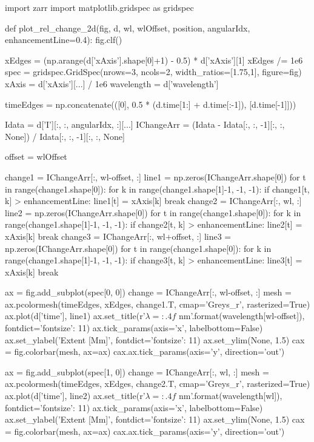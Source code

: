 \begin{pycode}[2DRT]
import zarr
import matplotlib.gridspec as gridspec


def plot_rel_change_2d(fig, d, wl, wlOffset, position, angularIdx, enhancementLine=0.4):
    fig.clf()

    xEdges = (np.arange(d['xAxis'].shape[0]+1) - 0.5) * d['xAxis'][1]
    xEdges /= 1e6
    spec = gridspec.GridSpec(nrows=3, ncols=2, width_ratios=[1.75,1], figure=fig)
    xAxis = d['xAxis'][...] / 1e6
    wavelength = d['wavelength']

    timeEdges = np.concatenate(([0],
                                0.5 * (d.time[1:] + d.time[:-1]),
                                [d.time[-1]]))

    Idata = d['I'][:, :, angularIdx, :][...]
    IChangeArr = (Idata - Idata[:, :, -1][:, :, None]) / Idata[:, :, -1][:, :, None]

    offset = wlOffset

    change1 = IChangeArr[:, wl-offset, :]
    line1 = np.zeros(IChangeArr.shape[0])
    for t in range(change1.shape[0]):
        for k in range(change1.shape[1]-1, -1, -1):
            if change1[t, k] > enhancementLine:
                line1[t] = xAxis[k]
                break
    change2 = IChangeArr[:, wl, :]
    line2 = np.zeros(IChangeArr.shape[0])
    for t in range(change1.shape[0]):
        for k in range(change1.shape[1]-1, -1, -1):
            if change2[t, k] > enhancementLine:
                line2[t] = xAxis[k]
                break
    change3 = IChangeArr[:, wl+offset, :]
    line3 = np.zeros(IChangeArr.shape[0])
    for t in range(change1.shape[0]):
        for k in range(change1.shape[1]-1, -1, -1):
            if change3[t, k] > enhancementLine:
                line3[t] = xAxis[k]
                break

    ax = fig.add_subplot(spec[0, 0])
    change = IChangeArr[:, wl-offset, :]
    mesh = ax.pcolormesh(timeEdges, xEdges, change1.T, cmap='Greys_r', rasterized=True)
    ax.plot(d['time'], line1)
    ax.set_title(r'$\lambda={:.4f}$ nm'.format(wavelength[wl-offset]), fontdict={'fontsize': 11})
    ax.tick_params(axis='x', labelbottom=False)
    ax.set_ylabel('Extent [Mm]', fontdict={'fontsize': 11})
    ax.set_ylim(None, 1.5)
    cax = fig.colorbar(mesh, ax=ax)
    cax.ax.tick_params(axis='y', direction='out')

    ax = fig.add_subplot(spec[1, 0])
    change = IChangeArr[:, wl, :]
    mesh = ax.pcolormesh(timeEdges, xEdges, change2.T, cmap='Greys_r', rasterized=True)
    ax.plot(d['time'], line2)
    ax.set_title(r'$\lambda={:.4f}$ nm'.format(wavelength[wl]), fontdict={'fontsize': 11})
    ax.tick_params(axis='x', labelbottom=False)
    ax.set_ylabel('Extent [Mm]', fontdict={'fontsize': 11})
    ax.set_ylim(None, 1.5)
    cax = fig.colorbar(mesh, ax=ax)
    cax.ax.tick_params(axis='y', direction='out')


\end{pycode}
